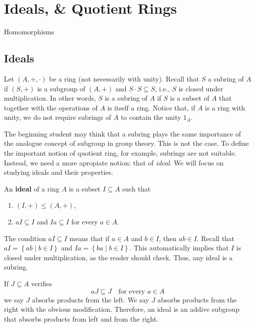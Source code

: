 \documentclass[11pt,a4paper]{article}
\begin{document}
\def\contador{Lesson 10}


\section{Ideals,  \& Quotient Rings}
Homomorphisms
\subsection{Ideals}

Let \((A,+,\cdot)\) be a ring (not necessarily with unity).
Recall that \(S\) a subring of \(A\)  if   \((S,+)\) is a subgroup of \((A,+)\) and \(S\cdot S \subseteq S\), i.e., \(S\) is closed under multiplication. 
In other words, \(S\) is  a   subring of \(A\) if \(S\) is a subset of \(A\) that  together with the operations of \(A\) is itself a ring.
Notice that, if \(A\) is a ring with unity,  we do not require subrings of \(A\) to  contain the unity \(1_A\).

The beginning student may think that a subring plays the same importance of the analogue concept of subgroup in group theory.
This is not the case.
To define the important notion of quotient ring, for example, subrings are not suitable.
Instead, we need a more apropiate notion: that of \textit{ideal}.
We will focus on studying ideals and their properties.

\begin{defi}
    An \textbf{ideal} of a ring \(A\) is a subset \(I\subseteq A\) such that 
    \begin{enumerate}[label=(\roman*)]
        \item \((I,+)\leq (A,+)\),  
        \item \(a I \subseteq I\) and \(Ia \subseteq I\) for every \(a\in A\).
    \end{enumerate}
\end{defi}

The condition \(aI\subseteq I\)  means that if \(a\in A\) and \(b \in I\), then \(ab \in I\). Recall that \(aI = \left\{ a b \mid b\in I \right\}\)
and  \(I a = \left\{  ba  \mid b\in I \right\}\).
This automatically implies that \(I\) is closed under multiplication, as the reader should check.
Thus, any   ideal is a subring.

If \(J\subseteq A\) verifies 
\[a J \subseteq J\quad\text{for every }a\in A\]
we say \(J\) absorbs products from the left.
We say \(J\) absorbs products from the right with the obvious modification.
Therefore, an ideal is an addive subgroup that absorbs products from left and from the right.
\end{document}
